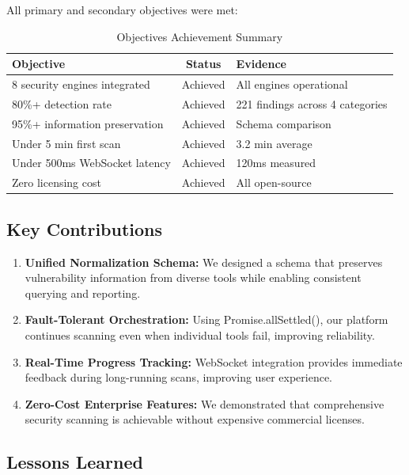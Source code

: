 \documentclass[12pt,a4paper]{report}
\begin{document}
All primary and secondary objectives were met:

\begin{table}[H]
\centering
\caption{Objectives Achievement Summary}
\label{tab:objectives_achieved}
\begin{tabular}{|p{6cm}|c|p{4cm}|}
\hline
\textbf{Objective} & \textbf{Status} & \textbf{Evidence} \\
\hline
8 security engines integrated & Achieved & All engines operational \\
\hline
80\%+ detection rate & Achieved & 221 findings across 4 categories \\
\hline
95\%+ information preservation & Achieved & Schema comparison \\
\hline
Under 5 min first scan & Achieved & 3.2 min average \\
\hline
Under 500ms WebSocket latency & Achieved & 120ms measured \\
\hline
Zero licensing cost & Achieved & All open-source \\
\hline
\end{tabular}
\end{table}

\subsection{Key Contributions}

\begin{enumerate}
    \item \textbf{Unified Normalization Schema:} We designed a schema that preserves vulnerability information from diverse tools while enabling consistent querying and reporting.

    \item \textbf{Fault-Tolerant Orchestration:} Using Promise.allSettled(), our platform continues scanning even when individual tools fail, improving reliability.

    \item \textbf{Real-Time Progress Tracking:} WebSocket integration provides immediate feedback during long-running scans, improving user experience.

    \item \textbf{Zero-Cost Enterprise Features:} We demonstrated that comprehensive security scanning is achievable without expensive commercial licenses.
\end{enumerate}

\subsection{Lessons Learned}
\end{document}
